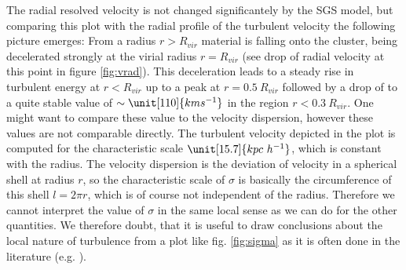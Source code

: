 The radial resolved velocity is not changed significantely by
the SGS model, but comparing this plot with the radial profile of the turbulent
velocity the following picture emerges: From a radius $r > R_{vir}$
material is falling onto the cluster, being decelerated strongly at the
virial radius $r = R_{vir}$ (see drop of radial velocity at this point in
figure \ref{fig:vrad}). This deceleration leads to a steady rise in turbulent
energy at $r<R_{vir}$ up to a peak at $r=0.5\ R_{vir}$ followed by a drop of to
a quite stable value of $\sim \unit[110]{km s^{-1}}$ in the region 
$r<0.3\ R_{vir}$. One might want to compare these value to the velocity
dispersion, however these values are not comparable directly. The turbulent
velocity depicted in the plot is computed for the characteristic scale
$\unit[15.7]{kpc\ h^{-1}}$, which is constant with the radius. The velocity
dispersion is the deviation of velocity in a spherical shell at radius $r$, so
the characteristic scale of $\sigma$ is basically the circumference of this
shell
$l=2\pi r$, which is of course not independent of the radius. Therefore we
cannot interpret the value of $\sigma$ in the same local sense as we can do for
the other quantities. We therefore doubt, that it is useful to draw conclusions
about the local nature of turbulence from a plot like fig. \ref{fig:sigma} as
it is often done in the literature (e.g. \citep{Norman1999a}). 

